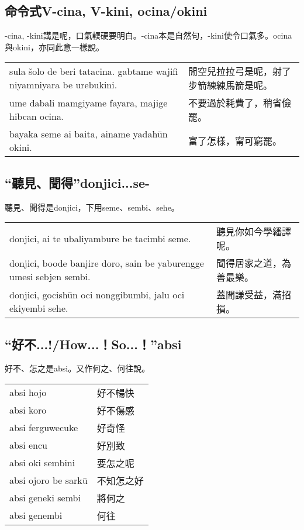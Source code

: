 \documentclass{article}
\begin{document}
\subsection{命令式V-cina, V-kini, ocina/okini}
\noindent -cina, -kini講是呢，口氣輭硬要明白。-cina本是自然句，-kini使令口氣多。ocina與okini，亦同此意一樣說。
\begin{center}
    \begin{tabularx}{\textwidth}{XX}
        sula \v{s}olo de beri tatacina. gabtame wajifi niyamniyara be urebukini. & 閒空兒拉拉弓是呢，射了步箭練練馬箭是呢。\\
        ume dabali mamgiyame fayara, majige hibcan ocina.& 不要過於耗費了，稍省儉罷。\\
        bayaka seme ai baita, ainame yadah\={u}n okini. & 富了怎樣，甯可窮罷。
    \end{tabularx}
\end{center}

\subsection{“聽見、聞得”donjici...se-}
\noindent 聽見、聞得是donjici，下用seme、sembi、sehe。
\begin{center}
    \begin{tabularx}{\textwidth}{XX}
        donjici, ai te ubaliyambure be tacimbi seme. &聽見你如今學繙譯呢。\\
        donjici, boode banjire doro, sain be yaburengge umesi sebjen sembi. & 聞得居家之道，為善最樂。\\
        donjici, gocish\={u}n oci nonggibumbi, jalu oci ekiyembi sehe. & 蓋聞謙受益，滿招損。
    \end{tabularx}
\end{center}

\subsection{“好不...!/How...！So...！”absi}
\noindent 好不、怎之是absi。又作何之、何往說。
\begin{center}
    \begin{tabularx}{\textwidth}{XX}
        absi hojo & 好不暢快\\
        absi koro & 好不傷感\\
        absi ferguwecuke & 好奇怪\\
        absi encu & 好別致\\
        absi oki sembini & 要怎之呢\\
        absi ojoro be sark\={u} & 不知怎之好\\
        absi geneki sembi & 將何之\\
        absi genembi & 何往
    \end{tabularx}
\end{center}
\end{document}
